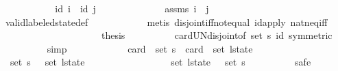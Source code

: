 \begin{isabellebody}
\ \ \ \ \ \ \ \ \isamarkupfalse%
\ \isamarkupfalse%
\ {\isachardoublequoteopen}id\ i\ {\isasyminter}\ id\ j\ {\isacharequal}\ {\isacharbraceleft}{\isacharbraceright}{\isachardoublequoteclose}\isanewline
\ \ \ \ \ \ \ \ \ \ \isamarkupfalse%
\ assms\ {\isacharbackquoteopen}i\ {\isasymnoteq}\ j{\isacharbackquoteclose}\isanewline
\ \ \ \ \ \ \ \ \ \ \isamarkupfalse%
\ valid{\isacharunderscore}labeled{\isacharunderscore}state{\isacharunderscore}def\isanewline
\ \ \ \ \ \ \ \ \ \ \isamarkupfalse%
\ {\isacharparenleft}metis\ disjoint{\isacharunderscore}iff{\isacharunderscore}not{\isacharunderscore}equal\ id{\isacharunderscore}apply\ nat{\isacharunderscore}neq{\isacharunderscore}iff{\isacharparenright}\isanewline
\ \ \ \ \ \ \isamarkupfalse%
\isanewline
\ \ \ \ \ \ \isamarkupfalse%
\isanewline
\ \ \ \ \ \ \isamarkupfalse%
\ {\isacharquery}thesis\isanewline
\ \ \ \ \ \ \ \ \isamarkupfalse%
\ card{\isacharunderscore}UN{\isacharunderscore}disjoint{\isacharbrackleft}of\ {\isachardoublequoteopen}set\ {\isacharquery}s{\isachardoublequoteclose}\ id{\isacharcomma}\ symmetric{\isacharbrackright}\isanewline
\ \ \ \ \ \ \ \ \isamarkupfalse%
\ simp\isanewline
\ \ \ \ \isamarkupfalse%
\isanewline
\ \ \ \ \isamarkupfalse%
\ \isamarkupfalse%
\ {\isachardoublequoteopen}card\ {\isacharparenleft}{\isasymUnion}\ {\isacharparenleft}set\ {\isacharquery}s{\isacharparenright}{\isacharparenright}\ {\isacharequal}\ card\ {\isacharparenleft}{\isasymUnion}\ {\isacharparenleft}set\ l{\isacharunderscore}state{\isacharparenright}{\isacharparenright}{\isachardoublequoteclose}\isanewline
\ \ \ \ \isamarkupfalse%
{\isacharminus}\isanewline
\ \ \ \ \ \ \isamarkupfalse%
\ {\isachardoublequoteopen}{\isasymUnion}\ {\isacharparenleft}set\ {\isacharquery}s{\isacharparenright}\ {\isacharequal}\ {\isasymUnion}\ {\isacharparenleft}set\ l{\isacharunderscore}state{\isacharparenright}{\isachardoublequoteclose}\isanewline
\ \ \ \ \ \ \isamarkupfalse%
\isanewline
\ \ \ \ \ \ \ \ \isamarkupfalse%
\ {\isachardoublequoteopen}{\isasymUnion}\ {\isacharparenleft}set\ l{\isacharunderscore}state{\isacharparenright}\ {\isasymsubseteq}\ {\isasymUnion}\ {\isacharparenleft}set\ {\isacharquery}s{\isacharparenright}{\isachardoublequoteclose}\isanewline
\ \ \ \ \ \ \ \ \isamarkupfalse%
\ safe\isanewline
\ \ \ \ \ \ \ \ \ \ \isamarkupfalse%

\end{isabellebody}
